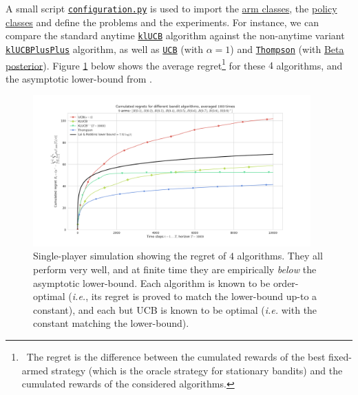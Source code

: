 \documentclass[a4paper,10pt,]{article}
\begin{document}
A small script
\href{https://smpybandits.github.io/docs/configuration.html}{\texttt{configuration.py}}
is used to import the
\href{https://smpybandits.github.io/docs/Arms.html}{arm classes}, the
\href{https://smpybandits.github.io/docs/Policies.html}{policy classes}
and define the problems and the experiments. For instance, we can
compare the standard anytime
\href{https://smpybandits.github.io/docs/Policies.klUCB.html}{\texttt{klUCB}}
algorithm against the non-anytime variant
\href{https://smpybandits.github.io/docs/Policies.klUCBPlusPlus.html}{\texttt{klUCBPlusPlus}}
algorithm, as well as
\href{https://smpybandits.github.io/docs/Policies.UCBalpha.html}{\texttt{UCB}}
(with \(\alpha=1\)) and
\href{https://smpybandits.github.io/docs/Policies.Thompson.html}{\texttt{Thompson}}
(with
\href{https://smpybandits.github.io/docs/Policies.Posterior.Beta.html}{Beta
posterior}). Figure \ref{fig:plot1} below shows the average regret\footnote{~The regret is the difference between the cumulated
  rewards of the best fixed-armed strategy (which is the oracle strategy
  for stationary bandits) and the cumulated rewards of the considered
  algorithms.} for these \(4\) algorithms, and the asymptotic lower-bound from \citep{LaiRobbins85}.

\begin{figure}
\centering
\includegraphics[width=0.95\textwidth]{plots/paper/1.png}
\caption{\small Single-player simulation showing the regret of $4$ algorithms. They all perform very well, and at finite time they are empirically \emph{below} the asymptotic lower-bound. Each algorithm is known to be order-optimal (\emph{i.e.}, its regret is proved to match the lower-bound up-to a constant), and each but UCB is known to be optimal (\emph{i.e.} with the constant matching the lower-bound).}
\label{fig:plot1}
\end{figure}

\end{document}
